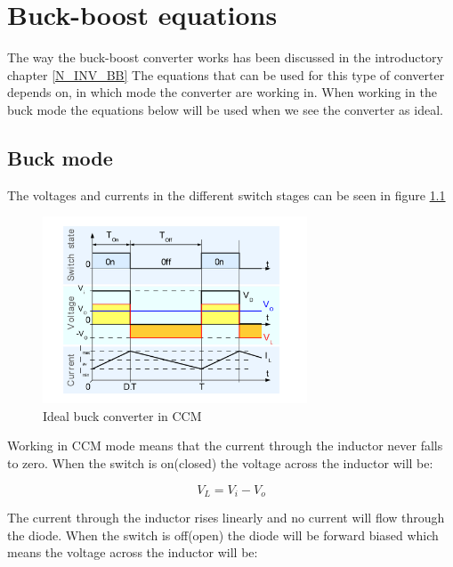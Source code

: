\chapter{Buck-boost equations}\label{ch:Appbuckboost}

The way the buck-boost converter works has been discussed in the introductory chapter \ref{N_INV_BB} The equations that can be used for this type of converter depends on, in which mode the converter are working in. When working in the buck mode the equations below will be used when we see the converter as ideal. 

\section{Buck mode}

The voltages and currents in the different switch stages can be seen in figure \ref{CCM_buck}

\begin{figure}[htbp]
	\begin{center}
		\includegraphics[width=0.7\textwidth]{../Pictures/CCM_buck}
		\caption{Ideal buck converter in CCM \cite{CCM_buck}}
		\label{CCM_buck}
	\end{center}	
\end{figure}

Working in CCM mode means that the current through the inductor never falls to zero. When the switch is on(closed) the voltage across the inductor will be: 

\begin{equation}
V_L = V_i-V_o
\end{equation} 

The current through the inductor rises linearly and no current will flow through the diode.
When the switch is off(open) the diode will be forward biased which means the voltage across the inductor will be:

